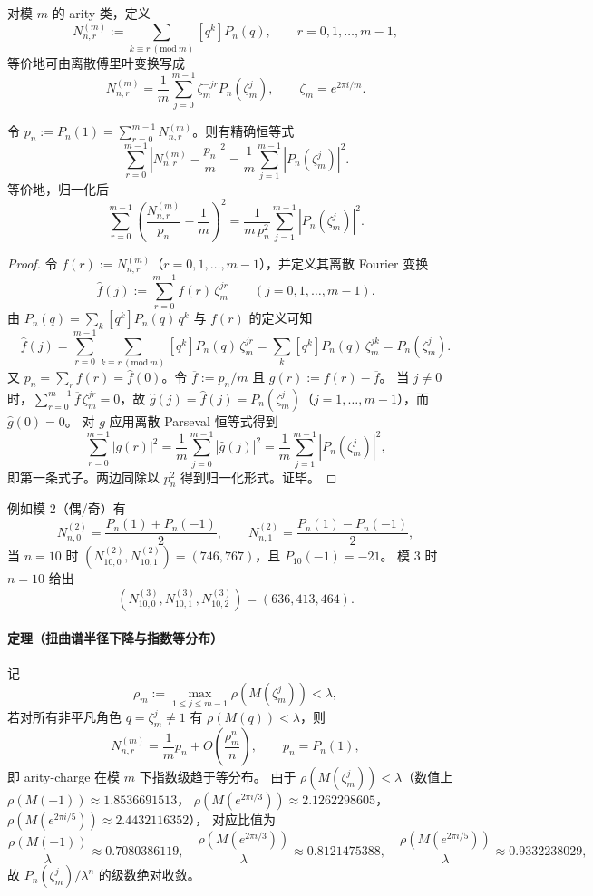 对模 $m$ 的 arity 类，定义
\[
N_{n,r}^{(m)}:=\sum_{k\equiv r\ (\mathrm{mod}\ m)}[q^k]P_n(q),
\qquad r=0,1,\dots,m-1,
\]
等价地可由离散傅里叶变换写成
\[
N_{n,r}^{(m)}=\frac{1}{m}\sum_{j=0}^{m-1}\zeta_m^{-jr}P_n(\zeta_m^j),
\qquad \zeta_m=e^{2\pi i/m}.
\]
\begin{theorem}\label{thm:real-input-40-arity-charge-parseval-energy}
令 \(p_n:=P_n(1)=\sum_{r=0}^{m-1}N_{n,r}^{(m)}\)。则有精确恒等式
\[
\sum_{r=0}^{m-1}\left|N_{n,r}^{(m)}-\frac{p_n}{m}\right|^2
=\frac{1}{m}\sum_{j=1}^{m-1}\left|P_n(\zeta_m^j)\right|^2.
\]
等价地，归一化后
\[
\sum_{r=0}^{m-1}\left(\frac{N_{n,r}^{(m)}}{p_n}-\frac{1}{m}\right)^2
=\frac{1}{m\,p_n^2}\sum_{j=1}^{m-1}\left|P_n(\zeta_m^j)\right|^2.
\]
\end{theorem}
\begin{proof}
令 \(f(r):=N_{n,r}^{(m)}\)（\(r=0,1,\dots,m-1\)），并定义其离散 Fourier 变换
\[
\widehat f(j):=\sum_{r=0}^{m-1} f(r)\,\zeta_m^{jr}\qquad (j=0,1,\dots,m-1).
\]
由 \(P_n(q)=\sum_k [q^k]P_n(q)\,q^k\) 与 \(f(r)\) 的定义可知
\[
\widehat f(j)=\sum_{r=0}^{m-1}\sum_{k\equiv r\ (\mathrm{mod}\ m)}[q^k]P_n(q)\,\zeta_m^{jr}
=\sum_k [q^k]P_n(q)\,\zeta_m^{jk}
=P_n(\zeta_m^j).
\]
又 \(p_n=\sum_r f(r)=\widehat f(0)\)。令 \(\overline f:=p_n/m\) 且 \(g(r):=f(r)-\overline f\)。
当 \(j\neq 0\) 时，\(\sum_{r=0}^{m-1}\overline f\,\zeta_m^{jr}=0\)，故 \(\widehat g(j)=\widehat f(j)=P_n(\zeta_m^j)\)（\(j=1,\dots,m-1\)），而 \(\widehat g(0)=0\)。
对 \(g\) 应用离散 Parseval 恒等式得到
\[
\sum_{r=0}^{m-1}|g(r)|^2=\frac{1}{m}\sum_{j=0}^{m-1}|\widehat g(j)|^2
=\frac{1}{m}\sum_{j=1}^{m-1}|P_n(\zeta_m^j)|^2,
\]
即第一条式子。两边同除以 \(p_n^2\) 得到归一化形式。证毕。
\end{proof}
例如模 $2$（偶/奇）有
\[
N_{n,0}^{(2)}=\frac{P_n(1)+P_n(-1)}{2},\qquad
N_{n,1}^{(2)}=\frac{P_n(1)-P_n(-1)}{2},
\]
当 $n=10$ 时 $(N_{10,0}^{(2)},N_{10,1}^{(2)})=(746,767)$，且 $P_{10}(-1)=-21$。
模 $3$ 时 $n=10$ 给出
\[
(N_{10,0}^{(3)},N_{10,1}^{(3)},N_{10,2}^{(3)})=(636,413,464).
\]
\paragraph{定理（扭曲谱半径下降与指数等分布）}
记
\[
\rho_m:=\max_{1\le j\le m-1}\rho(M(\zeta_m^j))<\lambda,
\]
若对所有非平凡角色 $q=\zeta_m^j\neq 1$ 有 $\rho(M(q))<\lambda$，则
\[
N_{n,r}^{(m)}=\frac{1}{m}p_n+O\!\left(\frac{\rho_m^n}{n}\right),
\qquad p_n=P_n(1),
\]
即 arity-charge 在模 $m$ 下指数级趋于等分布。
由于 $\rho(M(\zeta_m^j))<\lambda$（数值上
$\rho(M(-1))\approx 1.8536691513$，
$\rho(M(e^{2\pi i/3}))\approx 2.1262298605$，
$\rho(M(e^{2\pi i/5}))\approx 2.4432116352$），
对应比值为
\[
\frac{\rho(M(-1))}{\lambda}\approx 0.7080386119,\quad
\frac{\rho(M(e^{2\pi i/3}))}{\lambda}\approx 0.8121475388,\quad
\frac{\rho(M(e^{2\pi i/5}))}{\lambda}\approx 0.9332238029,
\]
故 $P_n(\zeta_m^j)/\lambda^n$ 的级数绝对收敛。
